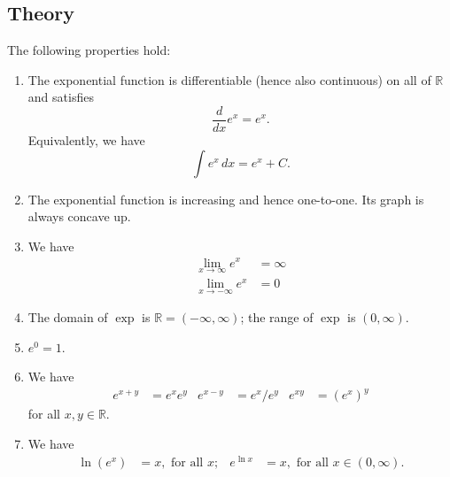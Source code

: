  \subsection*{Theory}
\begin{namedtheorem}
  The following properties hold:
  \begin{enumerate}[itemsep=0pt,topsep=0pt]
    \item The exponential function is differentiable (hence also continuous) on all of $\mathbb{R}$ and satisfies
    \[
    \frac{d}{dx}e^x=e^x.
    \]
    Equivalently, we have
    \[
    \int e^x\, dx=e^x+C.
    \]
    \item The exponential function is increasing and hence one-to-one. Its graph is always concave up.
    \item We have
    \begin{align*}
      \lim_{x\to\infty}e^x&=\infty\\
      \lim_{x\to -\infty}e^x&=0
    \end{align*}
    \item The domain of $\exp$ is $\mathbb{R}=(-\infty, \infty)$; the range of $\exp$ is $(0,\infty)$.
    \item $e^0=1$.
    \item We have
    \begin{align*}
      e^{x+y}&=e^xe^y &
      e^{x-y}&=e^x/e^y &
      e^{xy}&=(e^x)^y
    \end{align*}
    for all $x,y\in\mathbb{R}$.
    \item We have
    \begin{align*}
      \ln(e^x)&=x, \text{ for all $x$}; &
      e^{\ln x}&=x, \text{ for all $x\in (0,\infty)$.}
    \end{align*}
  \end{enumerate}
\end{namedtheorem}
